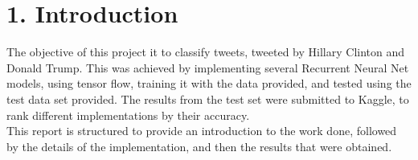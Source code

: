 \section*{1. Introduction} 


The objective of this project it to classify tweets, tweeted by Hillary Clinton and Donald Trump. This was achieved by implementing several Recurrent Neural Net models, using tensor flow, training it with the data provided, and tested using the test data set provided. The results from the test set were submitted to Kaggle, to rank different implementations by their accuracy.\\

	This report is structured to provide an introduction to the work done, followed by the details of the implementation, and then the results that were obtained. 	

